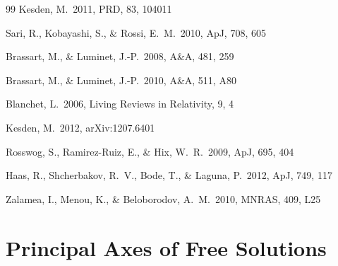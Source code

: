 \documentclass[useAMS, twocolumn, usenatbib]{mn2e}
\begin{document}
\begin{thebibliography}{99}
 Kesden, M.\ 2011, PRD, 83, 
104011 

 Sari, R., Kobayashi, S., 
\& Rossi, E.~M.\ 2010, ApJ, 708, 605 

 Brassart, M., \& Luminet, J.-P.\ 2008, A\&A, 481, 259 

 Brassart, M., \& Luminet, J.-P.\ 2010, A\&A, 511, A80 

 Blanchet, L.\ 2006, Living 
Reviews in Relativity, 9, 4 

 Kesden, M.\ 2012, 
arXiv:1207.6401 

 Rosswog, S., 
Ramirez-Ruiz, E., \& Hix, W.~R.\ 2009, ApJ, 695, 404 

 Haas, R., Shcherbakov, 
R.~V., Bode, T., \& Laguna, P.\ 2012, ApJ, 749, 117 

 Zalamea, I., Menou, K., 
\& Beloborodov, A.~M.\ 2010, MNRAS, 409, L25 

\end{thebibliography}


\appendix

\section{Principal Axes of Free Solutions}
\end{document}
